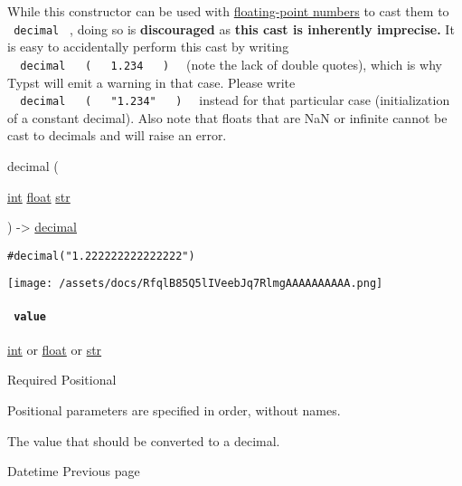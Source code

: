 While this constructor can be used with
\href{/docs/reference/foundations/float/}{floating-point numbers} to
cast them to \texttt{\ decimal\ } , doing so is \textbf{discouraged} as
\textbf{this cast is inherently imprecise.} It is easy to accidentally
perform this cast by writing
\texttt{\ }{\texttt{\ decimal\ }}\texttt{\ }{\texttt{\ (\ }}\texttt{\ }{\texttt{\ 1.234\ }}\texttt{\ }{\texttt{\ )\ }}\texttt{\ }
(note the lack of double quotes), which is why Typst will emit a warning
in that case. Please write
\texttt{\ }{\texttt{\ decimal\ }}\texttt{\ }{\texttt{\ (\ }}\texttt{\ }{\texttt{\ "1.234"\ }}\texttt{\ }{\texttt{\ )\ }}\texttt{\ }
instead for that particular case (initialization of a constant decimal).
Also note that floats that are NaN or infinite cannot be cast to
decimals and will raise an error.

{ decimal } (

{ \href{/docs/reference/foundations/int/}{int}
\href{/docs/reference/foundations/float/}{float}
\href{/docs/reference/foundations/str/}{str} }

) -\textgreater{} \href{/docs/reference/foundations/decimal/}{decimal}

\begin{verbatim}
#decimal("1.222222222222222")
\end{verbatim}

\texttt{[image: /assets/docs/RfqlB85Q5lIVeebJq7RlmgAAAAAAAAAA.png]}

\paragraph{\texorpdfstring{\texttt{\ value\ }}{ value }}\label{constructor-value}

\href{/docs/reference/foundations/int/}{int} {or}
\href{/docs/reference/foundations/float/}{float} {or}
\href{/docs/reference/foundations/str/}{str}

{Required} {{ Positional }}

\label{constructor-value-positional-tooltip}
Positional parameters are specified in order, without names.

The value that should be converted to a decimal.

\href{/docs/reference/foundations/datetime/}{\pandocbounded{}}

{ Datetime } { Previous page }

\href{/docs/reference/foundations/dictionary/}{\pandocbounded{}}

